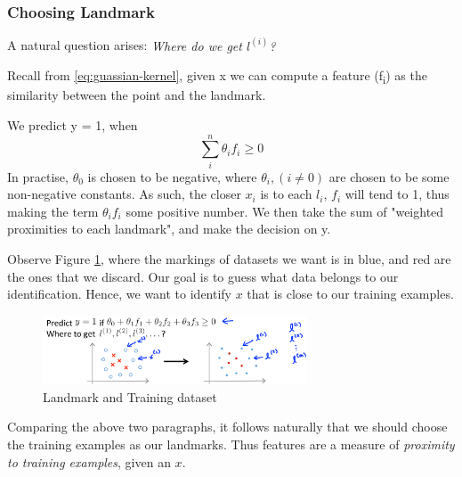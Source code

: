    \subsubsection{Choosing Landmark}
   A natural question arises: \emph{Where do we get $l^{(i)}$?} 
   \par Recall from \ref{eq:guassian-kernel}, given x we can compute a feature (f\textsubscript{i}) as the similarity between the point and the landmark.   


   We predict y = 1, when 
   \[
       \sum_{i}^{n} \theta_i f_i \geq 0
   \] 
   In practise, $\theta_0$ is chosen to be negative, where $\theta_i, (i\neq 0)$ are chosen to be some non-negative constants. As such, the closer $x_i$ is to each $l_i$, $f_i$ will tend to 1, thus making the term $\theta_i f_i$ some positive number. We then take the sum of "weighted proximities to each landmark", and make the decision on y. 

   \par Observe Figure \ref{fig:landmark-selection}, where the markings of datasets we want is in blue, and red are the ones that we discard. Our goal is to guess what data belongs to our identification. Hence, we want to identify $x$ that is close to our training examples. 

   \begin{figure}[htpb]
       \centering
       \includegraphics[width=0.7\textwidth]{image/landmark-selection.png}
       \caption{Landmark and Training dataset}
       \label{fig:landmark-selection}
   \end{figure}

   \par Comparing the above two paragraphs, it follows naturally that we should choose the training examples as our landmarks. Thus features are a measure of \emph{proximity to training examples}, given an $x$.
